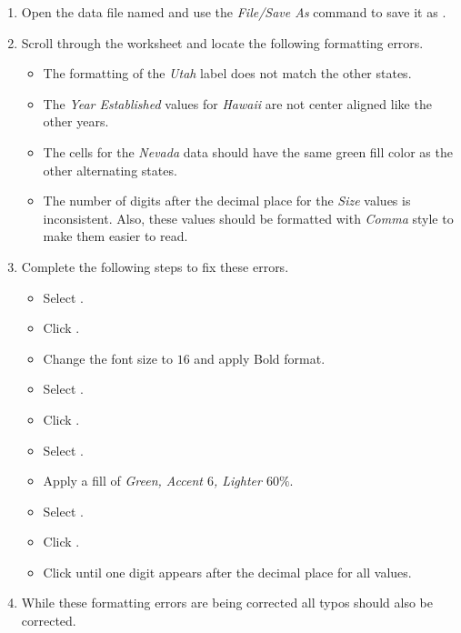 \begin{enumerate}
	\item Open the data file named  and use the \textit{File/Save As} command to save it as .
	\item Scroll through the worksheet and locate the following formatting errors.

	\begin{itemize}
		\item The formatting of the \textit{Utah} label does not match the other states.
		\item The \textit{Year Established} values for \textit{Hawaii} are not center aligned like the other years.
		\item The cells for the \textit{Nevada} data should have the same green fill color as the other alternating states.
		\item The number of digits after the decimal place for the \textit{Size} values is inconsistent. Also, these values should be formatted with \textit{Comma} style to make them easier to read.
	\end{itemize}

	\item Complete the following steps to fix these errors.

	\begin{itemize}
		\item Select . 
		\item Click .
		\item Change the font size to $ 16 $ and apply Bold format.
		\item Select .
		\item Click .
		\item Select .
		\item Apply a fill of \textit{Green, Accent $ 6 $, Lighter $ 60\% $}.
		\item Select . 
		\item Click .
		\item Click  until one digit appears after the decimal place for all values.
	\end{itemize}
	
	\item While these formatting errors are being corrected all typos should also be corrected.
\end{enumerate}

